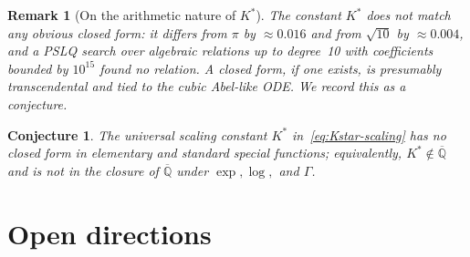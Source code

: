 \documentclass[11pt]{article}
\newtheorem{remark}[theorem]{Remark}
\newtheorem{conjecture}[theorem]{Conjecture}
\newcommand{\Q}{\mathbb{Q}}
\begin{document}
\begin{remark}[On the arithmetic nature of $K^{*}$]
The constant $K^{*}$ does not match any obvious closed form: it differs from
$\pi$ by $\approx 0.016$ and from $\sqrt{10}$ by $\approx 0.004$, and a PSLQ
search over algebraic relations up to degree~10 with coefficients bounded by
$10^{15}$ found no relation.  A closed form, if one exists, is presumably
transcendental and tied to the cubic Abel-like ODE.  We record this as a
conjecture.
\end{remark}

\begin{conjecture}\label{conj:Kstar}
The universal scaling constant $K^{*}$ in~\eqref{eq:Kstar-scaling} has no
closed form in elementary and standard special functions; equivalently,
$K^{*} \notin \overline{\Q}$ and is not in the closure of $\overline{\Q}$ under
$\exp, \log,$ and $\Gamma$.
\end{conjecture}

\section{Open directions}
\end{document}
